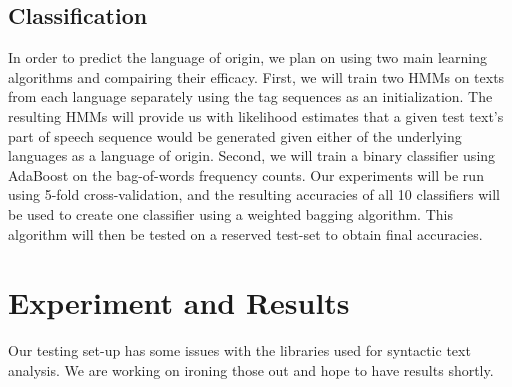 \documentclass[12pt]{article}
\begin{document}
\subsection{Classification}
In order to predict the language of origin, we plan on using two main learning algorithms and compairing their efficacy.  First, we will train two HMMs on texts from each language separately using the tag sequences as an initialization.  The resulting HMMs will provide us with likelihood estimates that a given test text's part of speech sequence would be generated given either of the underlying languages as a language of origin.  Second, we will train a binary classifier using AdaBoost on the bag-of-words frequency counts.  Our experiments will be run using 5-fold cross-validation, and the resulting accuracies of all 10 classifiers will be used to create one classifier using a weighted bagging algorithm.  This algorithm will then be tested on a reserved test-set to obtain final accuracies.

\section{Experiment and Results}
Our testing set-up has some issues with the libraries used for syntactic text analysis.  We are working on ironing those out and hope to have results shortly.
\end{document}
